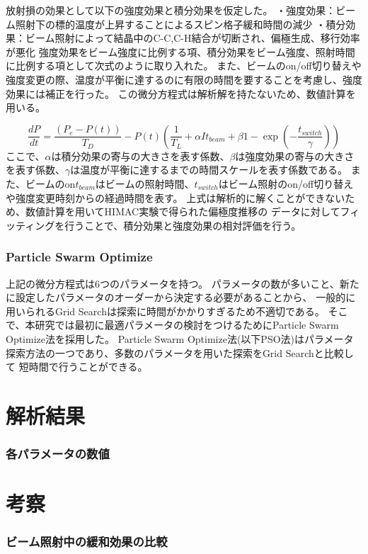 \documentclass[a5j]{jsarticle}
\begin{document}
放射損の効果として以下の強度効果と積分効果を仮定した。
・強度効果：ビーム照射下の標的温度が上昇することによるスピン格子緩和時間の減少
・積分効果：ビーム照射によって結晶中のC-C,C-H結合が切断され、偏極生成、移行効率が悪化
強度効果をビーム強度に比例する項、積分効果をビーム強度、照射時間に比例する項として次式のように取り入れた。
また、ビームのon/off切り替えや強度変更の際、温度が平衡に達するのに有限の時間を要することを考慮し、強度効果には補正を行った。
この微分方程式は解析解を持たないため、数値計算を用いる。

\begin{equation}
  \frac{dP}{dt}=\frac{(P_e-P(t))}{T_D}-P(t)(\frac{1}{T_L}+\alpha I t_{beam}+\beta{1-\exp(-\frac{t_{switch}}{\gamma})})
\end{equation}
ここで、$\alpha$は積分効果の寄与の大きさを表す係数、$\beta$は強度効果の寄与の大きさを表す係数、$\gamma$は温度が平衡に達するまでの時間スケールを表す係数である。
また、ビームのon$t_{beam}$はビームの照射時間、$t_{switch}$はビーム照射のon/off切り替えや強度変更時刻からの経過時間を表す。
上式は解析的に解くことができないため、数値計算を用いてHIMAC実験で得られた偏極度推移の
データに対してフィッティングを行うことで、積分効果と強度効果の相対評価を行う。
\section{Particle Swarm Optimize}

上記の微分方程式は6つのパラメータを持つ。
パラメータの数が多いこと、新たに設定したパラメータのオーダーから決定する必要があることから、
一般的に用いられるGrid Searchは探索に時間がかかりすぎるため不適切である。
そこで、本研究では最初に最適パラメータの検討をつけるためにParticle Swarm Optimize法を採用した。
Particle Swarm Optimize法(以下PSO法)はパラメータ探索方法の一つであり、多数のパラメータを用いた探索をGrid Searchと比較して
短時間で行うことができる。




\part{解析結果}
\section{各パラメータの数値}

\part{考察}
\section{ビーム照射中の緩和効果の比較}
\end{document}

